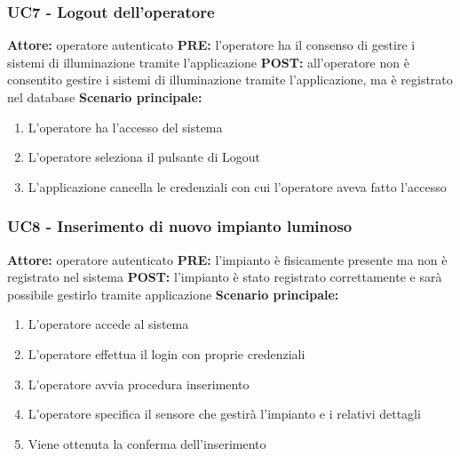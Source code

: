 \documentclass[a4paper, 12pt]{article}
\begin{document}
\subsubsection{UC7 - Logout dell'operatore}
\textbf{Attore:} operatore autenticato\newline
\textbf{PRE:} l'operatore ha il consenso di gestire i sistemi di illuminazione tramite l'applicazione\newline
\textbf{POST:} all'operatore non è consentito gestire i sistemi di illuminazione tramite l'applicazione, ma è registrato nel database\newline
\textbf{Scenario principale:}
\begin{enumerate}
    \item L'operatore ha l'accesso del sistema
    \item L'operatore seleziona il pulsante di Logout
    \item L'applicazione cancella le credenziali con cui l'operatore aveva fatto l'accesso
\end{enumerate}

\subsubsection{UC8 - Inserimento di nuovo impianto luminoso}
\textbf{Attore:} operatore autenticato\newline
\textbf{PRE:} l'impianto è fisicamente presente ma non è registrato nel sistema\newline
\textbf{POST:} l'impianto è stato registrato correttamente e sarà possibile gestirlo tramite applicazione\newline
\textbf{Scenario principale:}
\begin{enumerate}
    \item L'operatore accede al sistema
    \item L'operatore effettua il login con proprie credenziali
    \item L'operatore avvia procedura inserimento
    \item L'operatore specifica il sensore che gestirà l'impianto e i relativi dettagli
    \item Viene ottenuta la conferma dell'inserimento
\end{enumerate}
\end{document}
